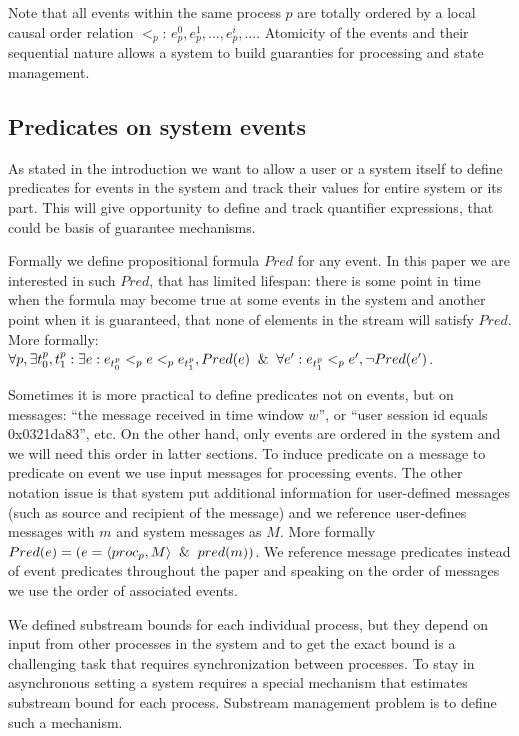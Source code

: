 Note that all events within the same process $p$ are totally ordered by a local causal order relation $<_p$: $e^{0}_p,e^{1}_p,...,e^{i}_p,...$. Atomicity of the events and their sequential nature allows a system to build guaranties for processing and state management.

\subsection{Predicates on system events}
As stated in the introduction we want to allow a user or a system itself to define predicates for events in the system and track their values for entire system or its part. This will give opportunity to define and track quantifier expressions, that could be basis of guarantee mechanisms.

Formally we define propositional formula $Pred$ for any event. In this paper we are interested in such $Pred$, that has limited lifespan: there is some point in time when the formula may become true at some events in the system and another point when it is guaranteed, that none of elements in the stream will satisfy $Pred$. More formally: $\forall p, \exists t_0^p, t_1^p: \exists e: e_{t_0^p} <_p e <_p e_{t_1^p}, Pred(e) \And \forall e': e_{t_1^p} <_p e', \neg Pred(e')$.

Sometimes it is more practical to define predicates not on events, but on messages: ``the message received in time window $w$'', or ``user session id equals 0x0321da83'', etc. On the other hand, only events are ordered in the system and we will need this order in latter sections. To induce predicate on a message to predicate on event we use input messages for processing events. The other notation issue is that system put additional information for user-defined messages (such as source and recipient of the message) and we reference user-defines messages with $m$ and system messages as $M$. More formally $Pred(e) = (e=\langle proc_p, M \rangle \And pred(m))$. We reference message predicates instead of event predicates throughout the paper and speaking on the order of messages we use the order of associated events.

We defined substream bounds for each individual process, but they depend on input from other processes in the system and to get the exact bound is a challenging task that requires synchronization between processes. To stay in asynchronous setting a system requires a special mechanism that estimates substream bound for each process. Substream management problem is to define such a mechanism.

